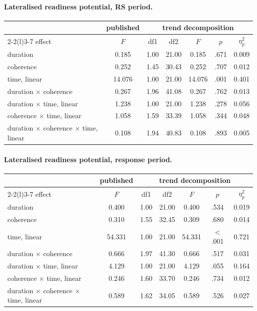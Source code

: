 \paragraph{Lateralised readiness potential, RS period.}
\begin{center}\small
\begin{tabular}{lcccccc}
\toprule
 & \multicolumn{1}{c}{published} & \multicolumn{5}{c}{trend decomposition}\\
\cmidrule(lr){2-2}\cmidrule(l){3-7}
effect & $F$ & df1 & df2 & $F$ & $p$ & $\eta_p^2$\\
\midrule
duration & 0.185 & 1.00 & 21.00 & 0.185 & .671 & 0.009\\
coherence & 0.252 & 1.45 & 30.43 & 0.252 & .707 & 0.012\\
time, linear & 14.076 & 1.00 & 21.00 & 14.076 & .001 & 0.401\\
duration $\times$ coherence & 0.267 & 1.96 & 41.08 & 0.267 & .762 & 0.013\\
duration $\times$ time, linear & 1.238 & 1.00 & 21.00 & 1.238 & .278 & 0.056\\
coherence $\times$ time, linear & 1.058 & 1.59 & 33.39 & 1.058 & .344 & 0.048\\
duration $\times$ coherence $\times$ time, linear & 0.108 & 1.94 & 40.83 & 0.108 & .893 & 0.005\\
\bottomrule
\end{tabular}
\end{center}

\paragraph{Lateralised readiness potential, response period.}
\begin{center}\small
\begin{tabular}{lcccccc}
\toprule
 & \multicolumn{1}{c}{published} & \multicolumn{5}{c}{trend decomposition}\\
\cmidrule(lr){2-2}\cmidrule(l){3-7}
effect & $F$ & df1 & df2 & $F$ & $p$ & $\eta_p^2$\\
\midrule
duration & 0.400 & 1.00 & 21.00 & 0.400 & .534 & 0.019\\
coherence & 0.310 & 1.55 & 32.45 & 0.309 & .680 & 0.014\\
time, linear & 54.331 & 1.00 & 21.00 & 54.331 & $<$.001 & 0.721\\
duration $\times$ coherence & 0.666 & 1.97 & 41.30 & 0.666 & .517 & 0.031\\
duration $\times$ time, linear & 4.129 & 1.00 & 21.00 & 4.129 & .055 & 0.164\\
coherence $\times$ time, linear & 0.246 & 1.60 & 33.70 & 0.246 & .734 & 0.012\\
duration $\times$ coherence $\times$ time, linear & 0.589 & 1.62 & 34.05 & 0.589 & .526 & 0.027\\
\bottomrule
\end{tabular}
\end{center}

